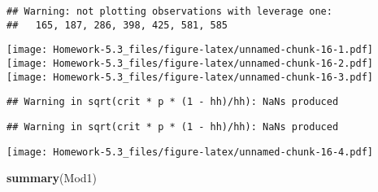 \documentclass[
]{article}
\newenvironment{Shaded}{\begin{snugshade}}{\end{snugshade}}
\newcommand{\KeywordTok}[1]{\textcolor[rgb]{0.13,0.29,0.53}{\textbf{#1}}}
\newcommand{\NormalTok}[1]{#1}
\begin{document}
\begin{verbatim}
## Warning: not plotting observations with leverage one:
##   165, 187, 286, 398, 425, 581, 585
\end{verbatim}

\texttt{[image: Homework-5.3\_files/figure-latex/unnamed-chunk-16-1.pdf]}
\texttt{[image: Homework-5.3\_files/figure-latex/unnamed-chunk-16-2.pdf]}
\texttt{[image: Homework-5.3\_files/figure-latex/unnamed-chunk-16-3.pdf]}

\begin{verbatim}
## Warning in sqrt(crit * p * (1 - hh)/hh): NaNs produced
\end{verbatim}

\begin{verbatim}
## Warning in sqrt(crit * p * (1 - hh)/hh): NaNs produced
\end{verbatim}

\texttt{[image: Homework-5.3\_files/figure-latex/unnamed-chunk-16-4.pdf]}

\begin{Shaded}
\begin{Highlighting}[]
\KeywordTok{summary}\NormalTok{(Mod1)}
\end{Highlighting}
\end{Shaded}
\end{document}

